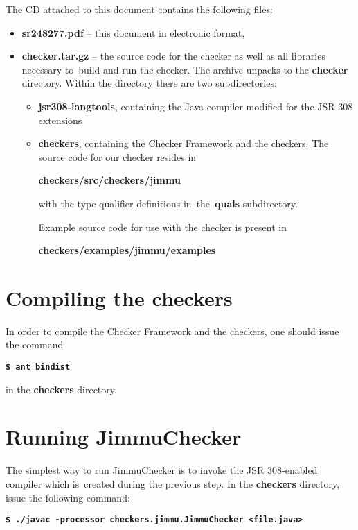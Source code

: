 \documentclass{pracamgr}
\theoremstyle{break}
\theoremstyle{break}
\theoremstyle{break}
\begin{document}
The CD attached to this document contains the following files: 
\begin{itemize}
\item \textbf{sr248277.pdf} -- this document in electronic format,
\item \textbf{checker.tar.gz} -- the source code for the checker as
  well as all libraries necessary to~build and run the checker. The
  archive unpacks to the \textbf{checker} directory. Within the
  directory there are two subdirectories:
  \begin{itemize}
  \item \textbf{jsr308-langtools}, containing the Java compiler
    modified for the JSR 308 extensions
  \item \textbf{checkers}, containing the Checker Framework and the
    checkers. The source code for our checker resides in
    \begin{center}
      \textbf{checkers/src/checkers/jimmu}
    \end{center}
    with the type qualifier definitions in~the~\textbf{quals}
    subdirectory.

    Example source code for use with the checker is present in
    \begin{center}
      \textbf{checkers/examples/jimmu/examples}
    \end{center}
  \end{itemize}
\end{itemize}

\section{Compiling the checkers}
\label{sec:compiling}

In order to compile the Checker Framework and the checkers, one should
issue the command

\indent \textbf{\texttt{\$ ant bindist}}

\noindent in the \textbf{checkers} directory. 

\section{Running JimmuChecker}

The simplest way to run JimmuChecker is to invoke the JSR 308-enabled
compiler which is~created during the previous step. In the
\textbf{checkers} directory, issue the following command:

\indent \textbf{\texttt{\$ ./javac -processor checkers.jimmu.JimmuChecker <file.java>}}
\end{document}
